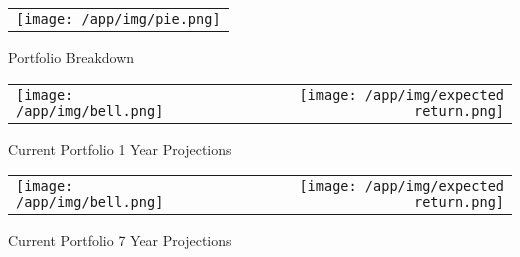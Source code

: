 \documentclass{article}
\begin{document}
\begin{adjustwidth}{-.3in}{0in}%
\vspace*{-1cm}

\begin{center}
  \begin{tabular}{c}
    \texttt{[image: /app/img/pie.png]}
  \end{tabular}
  \end{center}

  \begin{center}
        Portfolio Breakdown
  \end{center}

\vspace{.7cm}


\begin{center}
  \begin{tabular}{lcr}
  \texttt{[image: /app/img/bell.png]}
    & \hspace{1cm }&\texttt{[image: /app/img/expected return.png]}
  \end{tabular}
  \end{center}

  \begin{center}
      Current Portfolio 1 Year Projections
  \end{center}

  \vspace{.7cm}


\begin{center}
  \begin{tabular}{lcr}
  \texttt{[image: /app/img/bell.png]}
    & \hspace{1cm }&\texttt{[image: /app/img/expected return.png]}
  \end{tabular}
  \end{center}

  \begin{center}
      Current Portfolio 7 Year Projections
  \end{center}

 \vspace{.6cm}

\end{adjustwidth}
\end{document}
